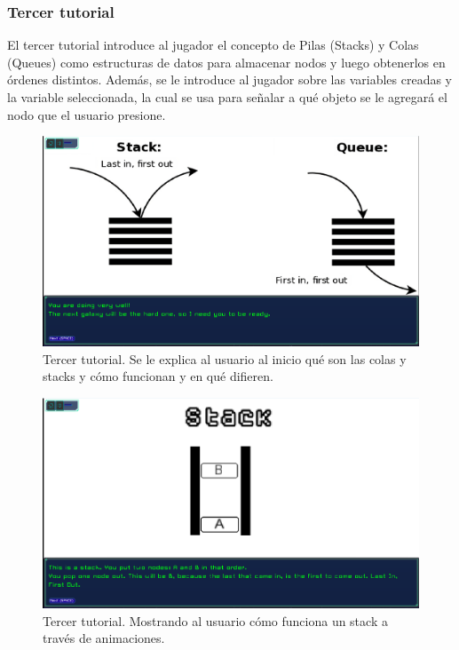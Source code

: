 \subsubsection{Tercer tutorial}

El tercer tutorial introduce al jugador el concepto de Pilas (Stacks) y Colas (Queues) como estructuras de datos para almacenar nodos y luego obtenerlos en órdenes distintos. Además, se le introduce al jugador sobre las variables creadas y la variable seleccionada, la cual se usa para señalar a qué objeto se le agregará el nodo que el usuario presione.

\begin{figure}[h]
	\centering
	\includegraphics[scale=0.3]{imagenes/ThirdTutorialFirstDialogue.png}
	\caption{Tercer tutorial. Se le explica al usuario al inicio qué son las colas y stacks y cómo funcionan y en qué difieren.}
	\label{ThirdTutorialFirstDialogue}
\end{figure}


\begin{figure}[h]
	\centering
	\includegraphics[scale=0.3]{imagenes/ThirdTutorialStackExplanation.png}
	\caption{Tercer tutorial. Mostrando al usuario cómo funciona un stack a través de animaciones.}
	\label{ThirdTutorialStackExplanation}
\end{figure}


